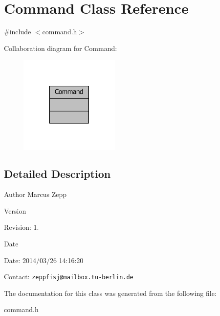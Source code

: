 \section{Command Class Reference}
\label{classCommand}


{\ttfamily \#include $<$command.\-h$>$}



Collaboration diagram for Command\-:
\nopagebreak
\begin{figure}[H]
\begin{center}
\leavevmode
\includegraphics[width=140pt]{df/d45/classCommand__coll__graph}
\end{center}
\end{figure}


\subsection{Detailed Description}
\begin{DoxyAuthor}{Author}
Marcus Zepp
\end{DoxyAuthor}
\begin{DoxyVersion}{Version}

\end{DoxyVersion}
\begin{DoxyParagraph}{Revision\-:}
1. 
\end{DoxyParagraph}


\begin{DoxyDate}{Date}

\end{DoxyDate}
\begin{DoxyParagraph}{Date\-:}
2014/03/26 14\-:16\-:20 
\end{DoxyParagraph}


Contact\-: {\tt zeppfisj@mailbox.\-tu-\/berlin.\-de} 

The documentation for this class was generated from the following file\-:\begin{DoxyCompactItemize}
\item 
command.\-h\end{DoxyCompactItemize}
